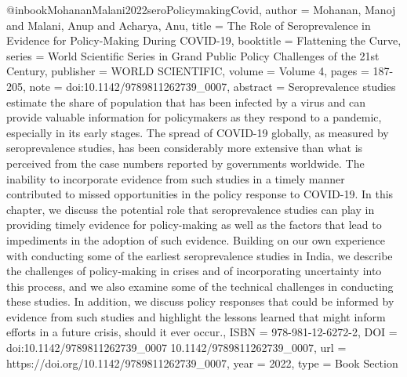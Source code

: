 {{{{@inbook{MohananMalani2022seroPolicymakingCovid,
   author = {Mohanan, Manoj and Malani, Anup and Acharya, Anu},
   title = {The Role of Seroprevalence in Evidence for Policy-Making During COVID-19},
   booktitle = {Flattening the Curve},
   series = {World Scientific Series in Grand Public Policy Challenges of the 21st Century},
   publisher = {WORLD SCIENTIFIC},
   volume = {Volume 4},
   pages = {187-205},
   note = {doi:10.1142/9789811262739_0007},
   abstract = {Seroprevalence studies estimate the share of population that has been infected by a virus and can provide valuable information for policymakers as they respond to a pandemic, especially in its early stages. The spread of COVID-19 globally, as measured by seroprevalence studies, has been considerably more extensive than what is perceived from the case numbers reported by governments worldwide. The inability to incorporate evidence from such studies in a timely manner contributed to missed opportunities in the policy response to COVID-19. In this chapter, we discuss the potential role that seroprevalence studies can play in providing timely evidence for policy-making as well as the factors that lead to impediments in the adoption of such evidence. Building on our own experience with conducting some of the earliest seroprevalence studies in India, we describe the challenges of policy-making in crises and of incorporating uncertainty into this process, and we also examine some of the technical challenges in conducting these studies. In addition, we discuss policy responses that could be informed by evidence from such studies and highlight the lessons learned that might inform efforts in a future crisis, should it ever occur.},
   ISBN = {978-981-12-6272-2},
   DOI = {doi:10.1142/9789811262739_0007
10.1142/9789811262739_0007},
   url = {https://doi.org/10.1142/9789811262739_0007},
   year = {2022},
   type = {Book Section}
}




}}}}
